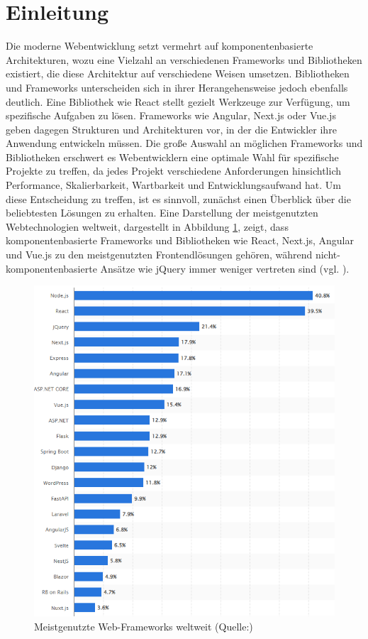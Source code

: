 \documentclass[oneside]{ausarbeitung}
\begin{document}
\section{Einleitung}
Die moderne Webentwicklung setzt vermehrt auf komponentenbasierte Architekturen, wozu eine Vielzahl an verschiedenen Frameworks und Bibliotheken existiert, die diese Architektur auf verschiedene Weisen umsetzen. Bibliotheken und Frameworks unterscheiden sich in ihrer Herangehensweise jedoch ebenfalls deutlich. Eine Bibliothek wie React stellt gezielt Werkzeuge zur Verfügung, um spezifische Aufgaben zu lösen. Frameworks wie Angular, Next.js oder Vue.js geben dagegen Strukturen und Architekturen vor, in der die Entwickler ihre Anwendung entwickeln müssen. 
Die große Auswahl an möglichen Frameworks und Bibliotheken erschwert es Webentwicklern eine optimale Wahl für spezifische Projekte zu treffen, da jedes Projekt verschiedene Anforderungen hinsichtlich Performance, Skalierbarkeit, Wartbarkeit und Entwicklungsaufwand hat. Um diese Entscheidung zu treffen, ist es sinnvoll, zunächst einen Überblick über die beliebtesten Lösungen zu erhalten. Eine Darstellung der meistgenutzten Webtechnologien weltweit, dargestellt in Abbildung \ref{fig:frameworks}, zeigt, dass komponentenbasierte Frameworks und Bibliotheken wie React, Next.js, Angular und Vue.js zu den meistgenutzten Frontendlösungen gehören, während nicht-komponentenbasierte Ansätze wie jQuery immer weniger vertreten sind (vgl. \parencite{statista2024}).

\begin{figure}[H]
    \centering
    \includegraphics[width=\textwidth]{images/web-frameworks.png}
    \caption{Meistgenutzte Web-Frameworks weltweit (Quelle:\parencite{statista2024})}
    \label{fig:frameworks}
\end{figure}
\end{document}
